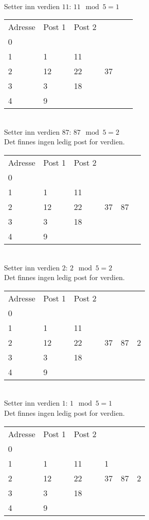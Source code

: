 \documentclass[a4paper, 12pt] {article}
\begin{document}
~\\
Setter inn verdien $11$: $11 \mod 5 = 1$\\
\begin{tabular}{|l|l|l|lll}
    \hline
    Adresse & Post 1 & Post 2	& ~ \\
    0       & ~      & ~      \\
    1       & 1      & 11      \\
    2       & 12     & 22	& 37 \\
    3       & 3      & 18     \\
    4       & 9      & ~      \\ \hline
\end{tabular}


~\\
Setter inn verdien $87$: $87 \mod 5 = 2$\\
Det finnes ingen ledig post for verdien.\\
\begin{tabular}{|l|l|l|lll}
    \hline
    Adresse & Post 1 & Post 2	& ~ \\
    0       & ~      & ~      \\
    1       & 1      & 11      \\
    2       & 12     & 22	& 37	&   87 \\
    3       & 3      & 18     \\
    4       & 9      & ~      \\ \hline
\end{tabular}

~\\
Setter inn verdien $2$: $2 \mod 5 = 2$\\
Det finnes ingen ledig post for verdien.\\
\begin{tabular}{|l|l|l|lll}
    \hline
    Adresse & Post 1 & Post 2	& ~ \\
    0       & ~      & ~      \\
    1       & 1      & 11      \\
    2       & 12     & 22	& 37	&   87	&   2\\
    3       & 3      & 18     \\
    4       & 9      & ~      \\ \hline
\end{tabular}

~\\
Setter inn verdien $1$: $1 \mod 5 = 1$\\
Det finnes ingen ledig post for verdien.\\
\begin{tabular}{|l|l|l|lll}
    \hline
    Adresse & Post 1 & Post 2	& ~ \\
    0       & ~      & ~      \\
    1       & 1      & 11   &	1      \\
    2       & 12     & 22	& 37	&   87	&   2\\
    3       & 3      & 18     \\
    4       & 9      & ~      \\ \hline
\end{tabular}
\end{document}
